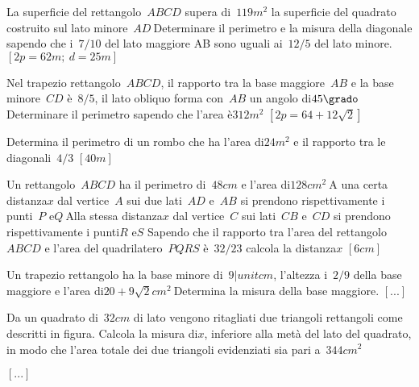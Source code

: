\begin{multicols}{2}
\begin{esercizio}[\Ast]
 \label{ese:3.139}
La superficie del rettangolo~$ABCD$ supera di~$119\unit{m^2}$ la superficie 
del quadrato
costruito sul lato minore~$AD~$Determinare il perimetro e la misura della
diagonale sapendo che i~$7/10$ del lato maggiore AB sono uguali ai~$12/5$ 
del
lato minore.
\hfill$\left[2p=62\unit{m};~d=25\unit{m}\right]$
\end{esercizio}

\begin{esercizio}[\Ast]
 \label{ese:3.140}
Nel trapezio rettangolo~$ABCD$, il rapporto tra la base maggiore~$AB$ e la 
base
minore~$CD$ è~$8/5$, il lato obliquo forma con~$AB$ un angolo di$ 
45\grado~$Determinare il perimetro sapendo che l'area è$312\unit{m^2}$
\hfill$\left[2p = 64 + 12 \sqrt{2}\right]$
\end{esercizio}

\begin{esercizio}[\Ast]
 \label{ese:3.141}
Determina il perimetro di un rombo che ha l'area di$24\unit{m^2}$ e il rapporto 
tra le diagonali~$4/3$
\hfill$\left[40\unit{m}\right]$
\end{esercizio}

\begin{esercizio}[\Ast]
 \label{ese:3.142}
Un rettangolo~$ABCD$ ha il perimetro di~$48\unit{cm}$ e l'area di$ 
128\unit{cm^2}~$A una certa
distanza$x$ dal vertice~$A$ sui due lati~$AD$ e~$AB$ si prendono 
rispettivamente i
punti~$P$ e$ Q~$Alla stessa distanza$ x$ dal vertice~$C$ sui lati~$CB$ 
e~$CD$ si
prendono rispettivamente i punti$ R$ e$ S$ Sapendo che il rapporto tra 
l'area
del rettangolo~$ABCD$ e l'area del quadrilatero~$PQRS$ è~$32/23$ calcola 
la
distanza$x$
\hfill$\left[6\unit{cm}\right]$
\end{esercizio}

\begin{esercizio}
 \label{ese:3.143}
Un trapezio rettangolo ha la base minore di~$9|unit{cm}$, l'altezza i~$2/9$ 
della base
maggiore e l'area di$20 + 9 \sqrt{2}\unit{cm^{2}}~$Determina la misura della 
base maggiore.
\hfill$\left[...\right]$
\end{esercizio}

\begin{esercizio}[\Ast]
 \label{ese:3.144}
Da un quadrato di~$32\unit{cm}$ di lato vengono ritagliati due triangoli 
rettangoli
come descritti in figura. Calcola la misura di$ x$,
inferiore alla metà del lato del quadrato, in modo che l'area totale dei
due triangoli evidenziati sia pari a~$344\unit{cm^2}$
\begin{center}
 
\end{center}
\hfill$\left[...\right]$
\end{esercizio}


\end{multicols}
